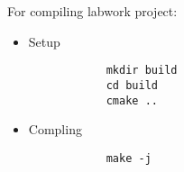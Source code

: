 \documentclass{article}
\begin{document}
For compiling labwork project:

\begin{itemize}
	\item Setup 
		\begin{verbatim}
			mkdir build
			cd build
			cmake ..
		\end{verbatim}
	\item Compling
		\begin{verbatim}
			make -j
		\end{verbatim}
\end{itemize}
\end{document}
